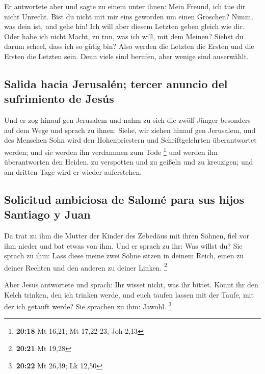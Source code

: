  Er antwortete aber und sagte zu einem unter ihnen: Mein
Freund, ich tue dir nicht Unrecht. Bist du nicht mit mir eins geworden
um einen Groschen?  Nimm, was dein ist, und gehe hin! Ich
will aber diesem Letzten geben gleich wie dir.  Oder habe
ich nicht Macht, zu tun, was ich will, mit dem Meinen? Siehst du darum
scheel, dass ich so gütig bin?  Also werden die Letzten
die Ersten und die Ersten die Letzten sein. Denn viele sind berufen,
aber wenige sind auserwählt.

\hypertarget{salida-hacia-jerusaluxe9n-tercer-anuncio-del-sufrimiento-de-jesuxfas}{%
\subsection{Salida hacia Jerusalén; tercer anuncio del sufrimiento de
Jesús}\label{salida-hacia-jerusaluxe9n-tercer-anuncio-del-sufrimiento-de-jesuxfas}}

 Und er zog hinauf gen Jerusalem und nahm zu sich die
zwölf Jünger besonders auf dem Wege und sprach zu ihnen: 
Siehe, wir ziehen hinauf gen Jerusalem, und des Menschen Sohn wird den
Hohenpriestern und Schriftgelehrten überantwortet werden; und sie werden
ihn verdammen zum Tode \footnote{\textbf{20:18} Mt 16,21; Mt 17,22-23;
  Joh 2,13}  und werden ihn überantworten den Heiden, zu
verspotten und zu geißeln und zu kreuzigen; und am dritten Tage wird er
wieder auferstehen.

\hypertarget{solicitud-ambiciosa-de-salomuxe9-para-sus-hijos-santiago-y-juan}{%
\subsection{Solicitud ambiciosa de Salomé para sus hijos Santiago y
Juan}\label{solicitud-ambiciosa-de-salomuxe9-para-sus-hijos-santiago-y-juan}}

 Da trat zu ihm die Mutter der Kinder des Zebedäus mit
ihren Söhnen, fiel vor ihm nieder und bat etwas von ihm. 
Und er sprach zu ihr: Was willst du? Sie sprach zu ihm: Lass diese meine
zwei Söhne sitzen in deinem Reich, einen zu deiner Rechten und den
anderen zu deiner Linken. \footnote{\textbf{20:21} Mt 19,28}

 Aber Jesus antwortete und sprach: Ihr wisset nicht, was
ihr bittet. Könnt ihr den Kelch trinken, den ich trinken werde, und euch
taufen lassen mit der Taufe, mit der ich getauft werde? Sie sprachen zu
ihm: Jawohl. \footnote{\textbf{20:22} Mt 26,39; Lk 12,50}

